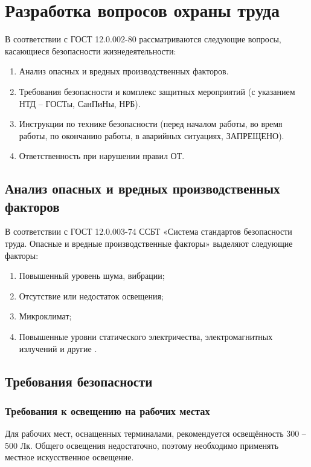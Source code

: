 \newpage
\section{Разработка вопросов охраны труда}
\setcounter{table}{0}

В соответствии с ГОСТ 12.0.002-80 рассматриваются следующие вопросы, касающиеся безопасности жизнедеятельности:

\begin{enumerate}
 \item Анализ опасных и вредных производственных факторов.
 \item Требования безопасности и комплекс защитных мероприятий (с указанием НТД – ГОСТы, СанПиНы, НРБ).
 \item Инструкции по технике безопасности (перед началом работы, во время работы, по окончанию работы, в аварийных ситуациях, ЗАПРЕЩЕНО).
 \item Ответственность при нарушении правил ОТ. 
\end{enumerate}

\subsection{Анализ опасных и вредных производственных факторов}

В соответствии с ГОСТ 12.0.003-74 ССБТ «Система стандартов безопасности труда. Опасные и вредные производственные факторы» выделяют следующие факторы:

\begin{enumerate}
 \item Повышенный уровень шума, вибрации;
 \item Отсутствие или недостаток освещения;
 \item Микроклимат;
 \item Повышенные уровни статического электричества, электромагнитных излучений и другие \cite{OT1}.
\end{enumerate}

\subsection{Требования безопасности}

\subsubsection{Требования к освещению на рабочих местах}

Для рабочих мест, оснащенных терминалами, рекомендуется освещённость 300 – 500 Лк. Общего освещения недостаточно, поэтому необходимо применять местное искусственное освещение.

